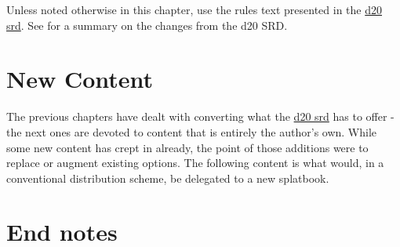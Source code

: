 \documentclass[a4paper,10pt]{article}
\begin{document}
\begin{multicols}{2}
Unless noted otherwise in this chapter, use the rules text presented in the \href{http://www.wizards.com/default.asp?x=d20/article/srd35}{d20 srd}. See  for a summary on the changes from the d20 SRD.
\newpage

\part{New Content}
The previous chapters have dealt with converting what the \href{http://www.wizards.com/default.asp?x=d20/article/srd35}{d20 srd} has to offer - the next ones are devoted to content that is entirely the author's own. While some new content has crept in already, the point of those additions were to replace or augment existing options. The following content is what would, in a conventional distribution scheme, be delegated to a new splatbook. 
\newpage
\part{End notes}

\end{multicols}
\end{document}
